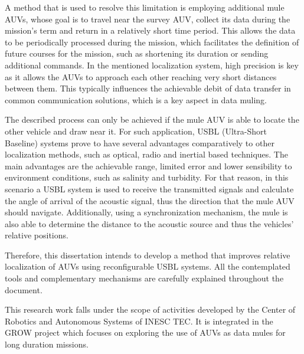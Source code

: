 A method that is used to resolve this limitation is employing additional mule AUVs, whose goal is to travel near the survey AUV, collect its data during the mission's term and return in a relatively short time period. This allows the data to be periodically processed during the mission, which facilitates the definition of future courses for the mission, such as shortening its duration or sending additional commands. In the mentioned localization system, high precision is key as it allows the AUVs to approach each other reaching very short distances between them. This typically influences the achievable debit of data transfer in common communication solutions, which is a key aspect in data muling.

The described process can only be achieved if the mule AUV is able to locate the other vehicle and draw near it. For such application, USBL (Ultra-Short Baseline) systems prove to have several advantages comparatively to other localization methods, such as optical, radio and inertial based techniques. The main advantages are the achievable range, limited error and lower sensibility to environment conditions, such as salinity and turbidity. For that reason, in this scenario a USBL system is used to receive the transmitted signals and calculate the angle of arrival of the acoustic signal, thus the direction that the mule AUV should navigate. Additionally, using a synchronization mechanism, the mule is also able to determine the distance to the acoustic source and thus the vehicles' relative positions.


Therefore, this dissertation intends to develop a method that improves relative localization of AUVs using reconfigurable USBL systems. All the contemplated tools and complementary mechanisms are carefully explained throughout the document. 

This research work falls under the scope of activities developed by the Center of Robotics and Autonomous Systems of INESC TEC. It is integrated in the GROW project which focuses on exploring the use of AUVs as data mules for long duration missions.

